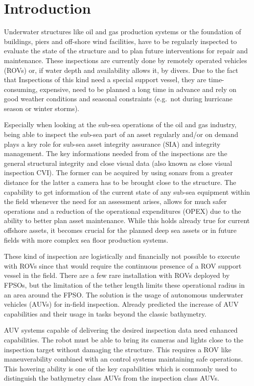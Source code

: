 \documentclass[conference]{IEEEtran}
\begin{document}
\section{Introduction}
Underwater structures like oil and gas production systems or the foundation of buildings, piers and off-shore wind facilities, have to be regularly inspected to evaluate the state of the structure and to plan future interventions for repair and maintenance. These inspections are currently done by remotely operated vehicles (ROVs) or, if water depth and availability allows it, by divers. Due to the fact that Inspections of this kind need a special support vessel, they are time-consuming, expensive, need to be planned a long time in advance and rely on good weather conditions and seasonal constraints (e.g.~not during hurricane season or winter storms).

Especially when looking at the sub-sea operations of the oil and gas industry, being able to inspect the sub-sea part of an asset regularly and/or on demand plays a key role for sub-sea asset integrity assurance (SIA) and integrity management. The key informations needed from of the inspections are the general structural integrity and close visual data (also known as close visual inspection CVI). The former can be acquired by using sonars from a greater distance for the latter a camera has to be brought close to the structure. The capability to get information of the current state of any sub-sea equipment within the field whenever the need for an assessment arises, allows for much safer operations and a reduction of the operational expenditures (OPEX) due to the ability to better plan asset maintenance. While this holds already true for current offshore assets, it becomes crucial for the planned deep sea assets or in future fields with more complex sea floor production systems.

These kind of inspection are logistically and financially not possible to execute with ROVs since that would require the continuous presence of a ROV support vessel in the field. There are a few rare installation with ROVs deployed by FPSOs, but the limitation of the tether length limits these operational radius in an area around the FPSO. The solution is the usage of autonomous underwater vehicles (AUVs) for in-field inspection. Already \cite{gamechanger07} predicted the increase of AUV capabilities and their usage in tasks beyond the classic bathymetry.

AUV systems capable of delivering the desired inspection data need enhanced capabilities. The robot must be able to bring its cameras and lights close to the inspection target without damaging the structure. This requires a ROV like maneuverability combined with an control systems maintaining safe operations. This hovering ability is one of the key capabilities which is commonly used to distinguish the bathymetry class AUVs from the inspection class AUVs.
\end{document}
